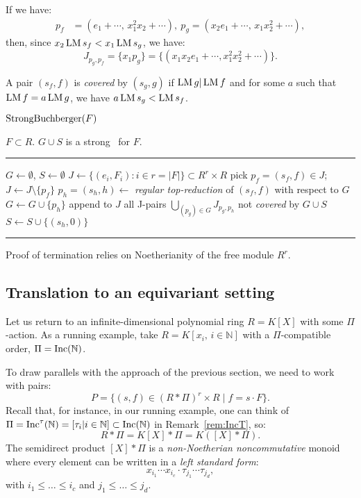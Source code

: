\begin{example} If we have:
\begin{align*}
p_f &= (e_1+\cdots,\,x_1^2x_2+\cdots), \ p_g = (x_2e_1+\cdots,\,x_1x_2^2+\cdots),
\end{align*}
then, since $x_2\operatorname{LM} s_f < x_1\operatorname{LM} s_g$, we have:
\[
J_{p_g,p_f} = \{x_1p_g\} = \{(x_1x_2e_1+\cdots, x_1^2x_2^2+\cdots)\}.
\]
\end{example}

A pair $(s_f,f)$ is {\em covered} by $(s_g,g)$ if $\operatorname{LM} g | \operatorname{LM} f$ and for some $a$ such that $\operatorname{LM} f = a \operatorname{LM} g$, we have $a\operatorname{LM} s_g < \operatorname{LM} s_f$. 

\begin{algorithm} \label{alg:StrongBuchberger} 
$\operatorname{StrongBuchberger}(F)$

\begin{algorithmic}[1]
\REQUIRE $F \subset R$.
\ENSURE $G \cup S$ is a strong \GB\ for $F$.
\smallskip \hrule \smallskip

\STATE $G\gets \emptyset$, $S\gets \emptyset$ 
\STATE $J\gets \{(e_i,F_i):i\in r=|F|\} \subset R^r\times R$ 
	\STATE pick $p_f = (s_f,f) \in J$; $J\gets J\setminus\{p_f\}$
	\STATE $p_h=(s_h,h) \gets$ {\em regular top-reduction} of $(s_f,f)$ with respect to $G$
		\STATE $G\gets G\cup \{p_h\}$
		\STATE append to $J$ all J-pairs $\bigcup_{(p_g)\in G}J_{p_g,p_h}$ not {\em covered} by $G \cup S$ 
        \ELSE 
                \STATE $S\gets S\cup\{(s_h,0)\}$
	\ENDIF
\ENDWHILE
\smallskip \hrule \smallskip
\end{algorithmic}
\end{algorithm}

Proof of termination relies on Noetherianity of the free module $R^r$. 

\subsection{Translation to an equivariant setting}
Let us return to an infinite-dimensional polynomial ring $R=K[X]$ with some $\Pi$-action. As a running example, take $R=K[x_i,\, i\in\mathbb N]$ with a $\Pi$-compatible order, $\Pi=\operatorname{Inc}(\mathbb N)$.

To draw parallels with the approach of the previous section, we need to work with pairs:
\[
P = \{(s,f)\in (R*\Pi)^r\times R \mid f=s\cdot F\}.
\]
Recall that, for instance, in our running example, one can think of $\Pi=\operatorname{Inc}^\tau(\mathbb N) = [\tau_i|i\in\mathbb N]\subset \operatorname{Inc}(\mathbb N)$ in Remark~\ref{rem:IncT}, so: \[R*\Pi = K[X]*\Pi = K([X]*\Pi).\] 
The semidirect product $[X]*\Pi$ is a {\em non-Noetherian noncommutative} monoid where every element can be written in a \emph{left standard form}: 
$$
x_{i_1}\cdots x_{i_c} \cdot \tau_{j_1} \cdots \tau_{j_d},
$$
with $i_1 \leq \ldots \leq i_c$ and $j_1 \leq \ldots \leq j_d$. 

